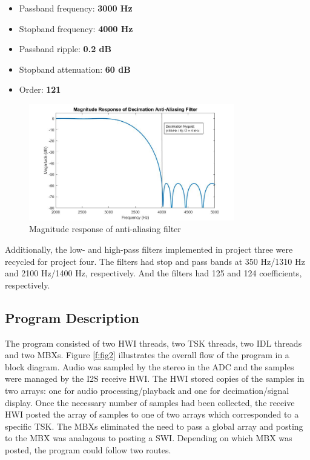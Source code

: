 \documentclass[11pt,pdftex,portrait,letterpaper]{article}
\begin{document}
\begin{itemize}
\item Passband frequency: \textbf{3000 Hz}
\item Stopband frequency: \textbf{4000 Hz}
\item Passband ripple: \textbf{0.2 dB}
\item Stopband attenuation: \textbf{60 dB}
\item Order: \textbf{121}
\end{itemize}

\begin{figure}[h]
\centering
\includegraphics[width=0.8\textwidth]{./MagResp}
\caption{Magnitude response of anti-aliasing filter}
\label{f:figa}
\end{figure}

Additionally, the low- and high-pass filters implemented in project three were recycled for project four. The filters had stop and pass bands at 350 Hz/1310 Hz and 2100 Hz/1400 Hz, respectively. And the filters had 125 and 124 coefficients, respectively.

\subsection{Program Description}

The program consisted of two HWI threads, two TSK threads, two IDL threads and two MBXs. Figure \ref{f:fig2} illustrates the overall flow of the program in a block diagram. Audio was sampled by the stereo in the ADC and the samples were managed by the I2S receive HWI. The HWI stored copies of the samples in two arrays: one for audio processing/playback and one for decimation/signal display. Once the necessary number of samples had been collected, the receive HWI posted the array of samples to one of two arrays which corresponded to a specific TSK. The MBXs eliminated the need to pass a global array and posting to the MBX was analagous to posting a SWI. Depending on which MBX was posted, the program could follow two routes.
\end{document}
